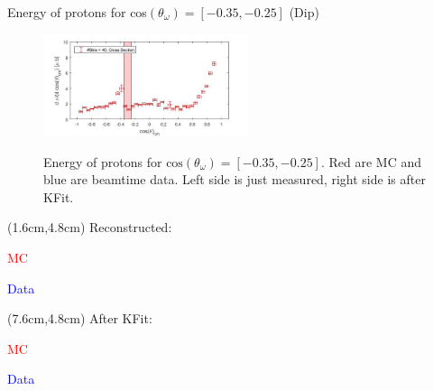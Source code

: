 \documentclass[
		10pt
		]{beamer}
\begin{document}
\begin{frame}{Energy of protons for cos$(\theta_{\omega})=[-0.35,-0.25]$ (Dip)}
	
	\begin{figure}
		\hspace{0cm}  \vspace{-1cm}
		\includegraphics[width=6cm]{Plots/7}
	\end{figure}
	
	\begin{figure}%
		\centering
		\qquad
		\captionsetup{labelformat=empty}
		\caption{Energy of protons for $\textrm{cos}(\theta_{\omega}) = [-0.35, -0.25] $. Red are MC and blue are beamtime data. Left side is just measured, right side is after KFit. }%
		\label{fig:example}%
	\end{figure}

\begin{textblock*}{4.5cm}(1.6cm,4.8cm)
	\footnotesize Reconstructed:
	
	\footnotesize \textcolor{red}{MC}
	
	\footnotesize \textcolor{blue}{Data}
\end{textblock*}

\begin{textblock*}{4.5cm}(7.6cm,4.8cm)
	\footnotesize After KFit:
	
	\footnotesize \textcolor{red}{MC}
	
	\footnotesize \textcolor{blue}{Data}
\end{textblock*}


	
\end{frame}
\end{document}
